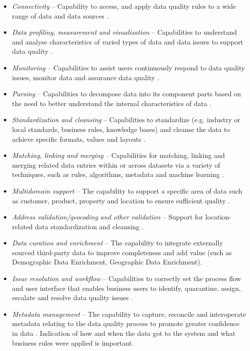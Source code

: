     		\begin{itemize}
				\item \textit{Connectivity} -- Capability to access, and apply data quality rules to a wide range of data  and data sources  \cite{Chien2019}. 
				\item \textit{Data profiling, measurement and visualization} -- Capabilities to understand and analyse characteristics of varied types of data  and data issues to support data quality \cite{Chien2019}.
				\item \textit{Monitoring} -- Capabilities to assist users continuously respond to data quality issues, monitor data and assurance data quality \cite{Chien2019}.
				\item \textit{Parsing} -- Capabilities to decompose data into its component parts based on the need to better understand the internal characteristics of data \cite{Chien2019}.
				\item \textit{Standardization and cleansing} -- Capabilities to standardize (e.g. industry or local standards, business rules, knowledge bases) and cleanse the data to achieve specific formats, values and layouts \cite{Chien2019}.
				\item \textit{Matching, linking and merging} -- Capabilities for matching, linking and merging related data entries within or across datasets via a variety of techniques, such as rules, algorithms, metadata and machine learning \cite{Chien2019}.
				\item \textit{Multidomain support} -- The capability to support a specific area of data such as customer, product, property and location to ensure sufficient quality \cite{Chien2019}.
				\item \textit{Address validation/geocoding and other validation} -- Support for location-related data standardization and cleansing \cite{Chien2019}.
				\item \textit{Data curation and enrichment} -- The capability to integrate externally sourced third-party data to improve completeness and add value (such as Demographic Data Enrichment, Geographic Data Enrichment)\cite{Chien2019}.
				\item \textit{Issue resolution and workflow} -- Capabilities to correctly set the process flow and user interface that enables business users to identify, quarantine, assign, escalate and resolve data quality issues \cite{Chien2019}.
				\item \textit{Metadata management} -- The capability to capture, reconcile and interoperate metadata relating to the data quality process to promote greater confidence in data \cite{Chien2019}. Indication of how and when the data got to the system and what business rules were applied is important.

\end{itemize}
